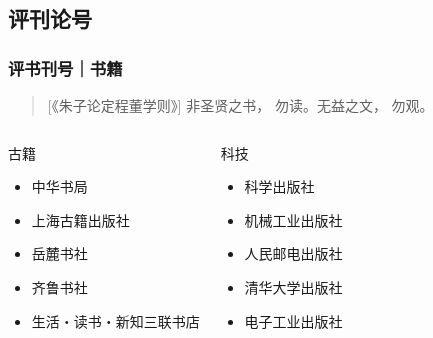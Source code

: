 \documentclass[11pt]{ctexbeamer}
\begin{document}
\subsection{评刊论号}
\begin{frame}
\frametitle{评书刊号｜书籍}
\begin{quotation}[《朱子论定程董学则》]
非圣贤之书， 勿读。无益之文， 勿观。
\end{quotation}
\begin{columns}
  \begin{block}{古籍}
    \begin{itemize}
      \item 中华书局
      \item 上海古籍出版社
      \item 岳麓书社
      \item 齐鲁书社
      \item 生活・读书・新知三联书店
    \end{itemize}
  \end{block}
  \begin{block}{科技}
    \begin{itemize}
      \item 科学出版社
      \item 机械工业出版社
      \item 人民邮电出版社
      \item 清华大学出版社
      \item 电子工业出版社
    \end{itemize}
  \end{block}
\end{columns}
\end{frame}
\end{document}

